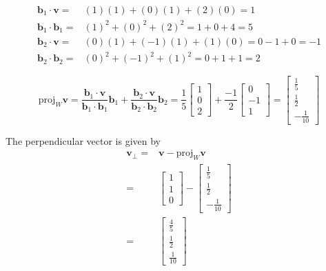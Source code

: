 \documentclass[a4paper,11pt,reqno]{amsart}
\numberwithin{equation}{section}
\begin{document}
\begin{enumerate}
\begin{center}
{{    \begin{eqnarray*}
    \mathbf{b}_1 \cdot \mathbf{v} =& (1)(1) + (0)(1) + (2)(0) = 1
    \\
    \mathbf{b}_1 \cdot \mathbf{b}_1 =& (1)^2 + (0)^2 + (2)^2 = 1 + 0 + 4 = 5
    \\
    \mathbf{b}_2 \cdot \mathbf{v} =& (0)(1) + (-1)(1) + (1)(0) = 0 - 1 + 0 = -1
    \\
    \mathbf{b}_2 \cdot \mathbf{b}_2 =& (0)^2 + (-1)^2 + (1)^2 = 0 + 1 + 1 = 2
    \end{eqnarray*}
    
   \[
    \text{proj}_W \mathbf{v} = \frac{\mathbf{b}_1 \cdot \mathbf{v}}{\mathbf{b}_1 \cdot \mathbf{b}_1} \mathbf{b}_1 + \frac{\mathbf{b}_2 \cdot \mathbf{v}}{\mathbf{b}_2 \cdot \mathbf{b}_2} \mathbf{b}_2
     = \frac{1}{5} \begin{bmatrix} 1 \\ 0 \\ 2 \end{bmatrix} + \frac{-1}{2} \begin{bmatrix} 0 \\ -1 \\ 1 \end{bmatrix}
    = \begin{bmatrix} \frac{1}{5} \\ \frac{1}{2} \\ -\frac{1}{10} \end{bmatrix}
    \]
    
   The perpendicular vector is given by
    \begin{eqnarray*}
    \mathbf{v}_{\perp} =& \mathbf{v} - \text{proj}_W \mathbf{v}\\
    =& \begin{bmatrix} 1 \\ 1 \\ 0 \end{bmatrix} - \begin{bmatrix} \frac{1}{5} \\ \frac{1}{2} \\ -\frac{1}{10} \end{bmatrix}\\
    =& \begin{bmatrix} \frac{4}{5} \\ \frac{1}{2} \\ \frac{1}{10} \end{bmatrix}
    \end{eqnarray*}
        
    }}
    \end{center}
\end{enumerate}
\end{document}
